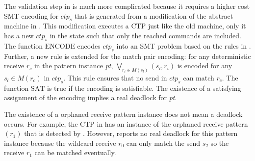 The validation step in  is much more complicated because it requires a higher cost SMT encoding for $\mathit{ctp_s}$ that is generated from a modification of the abstract machine in .
This modification executes a CTP just like the old machine, only it has a new $\mathit{ctp_s}$ in the state such that only the reached commands are included. 
The function $\mathrm{ENCODE}$ encodes $\mathit{ctp_s}$ into an SMT problem based on the rules in \cite{DBLP:conf/kbse/HuangMM13}. Further, a new rule is extended for the match pair encoding: for any deterministic receive $\mathit{r_c}$ in the pattern instance \textit{pt}, $\bigvee_{\mathit{r_i}\in\mathit{M}(\mathit{s_l})}(\mathit{s_l},\mathit{r_i})$ is encoded for any $\mathit{s_l}\in\mathit{M}(\mathit{r_c})$ in $\mathit{ctp_s}$. This rule ensures that no send in $\mathit{ctp_s}$ can match $\mathit{r_c}$. The function $\mathrm{SAT}$ is true if the encoding is satisfiable. The existence of a satisfying assignment of the encoding implies a real deadlock for \textit{pt}. 

\examplefigtwo

The existence of a orphaned receive pattern instance does not mean a deadlock occurs. For example, the CTP in  has an instance of the orphaned receive pattern $(r_1)$ that is detected by . However,  reports no real deadlock for this pattern instance because the wildcard receive $r_0$ can only match the send $s_2$ so the receive $r_1$ can be matched eventually.



